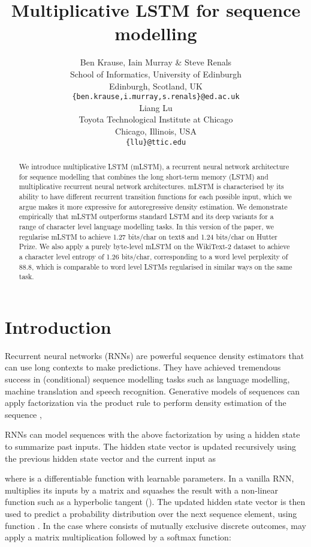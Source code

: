 \documentclass{article}
\title{Multiplicative LSTM for sequence modelling}
\author{Ben Krause, Iain Murray \& Steve Renals  \\
School of Informatics, University of Edinburgh\\
Edinburgh, Scotland, UK\\
\texttt{\{ben.krause,i.murray,s.renals\}@ed.ac.uk} \\
\And
Liang Lu \\
Toyota Technological Institute at Chicago \\
Chicago, Illinois, USA\\
\texttt{\{llu\}@ttic.edu} \\
}
\begin{document}
\maketitle

\begin{abstract}
We introduce multiplicative LSTM (mLSTM), a recurrent neural network architecture for sequence modelling that combines the long short-term memory (LSTM) and multiplicative recurrent neural network architectures. mLSTM is characterised by its ability to have different recurrent transition functions for each possible input, which we argue makes it more expressive for autoregressive density estimation. We demonstrate empirically that mLSTM outperforms standard LSTM and its deep variants for a range of character level language modelling tasks. In this version of the paper, we regularise mLSTM to achieve 1.27 bits/char on text8 and 1.24 bits/char on Hutter Prize. We also apply a purely byte-level mLSTM on the WikiText-2 dataset to achieve a character level entropy of 1.26 bits/char, corresponding to a word level perplexity of 88.8, which is comparable to word level LSTMs regularised in similar ways on the same task.
\end{abstract}
\section{Introduction}


Recurrent neural networks (RNNs) are powerful sequence density estimators that can use long contexts to make predictions.  They have achieved tremendous success in (conditional) sequence modelling tasks such as language modelling, machine translation and speech recognition.  Generative models of sequences can apply factorization via the product rule to perform density estimation of the sequence ,

 RNNs can model sequences with the above factorization by using a hidden state to summarize past inputs. The hidden state vector  is updated recursively using the previous hidden state vector  and the current input  as

where  is a differentiable function with learnable parameters. In a vanilla RNN,  multiplies its inputs by a matrix and squashes the result with a non-linear function such as a hyperbolic tangent (). The updated hidden state vector is then used to predict a probability distribution over the next sequence element, using function . In the case where  consists of mutually exclusive discrete outcomes,  may apply a matrix multiplication followed by a softmax function:
\end{document}
